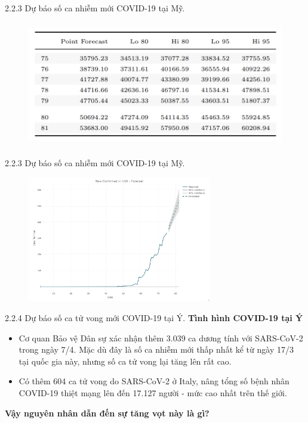 \documentclass[notheorems,envcountsect,hyperref=unicode]{beamer}
\begin{document}
\begin{frame}{2.2.3 Dự báo số ca nhiễm mới COVID-19 tại Mỹ.}
	\begin{figure}[!htb]
		\centering
		\includegraphics[width=1\linewidth,height=5.5cm]{duong3} 
	\end{figure}
\end{frame}

\begin{frame}{2.2.3 Dự báo số ca nhiễm mới COVID-19 tại Mỹ.}
	\begin{figure}[!htb]
		\centering
		\includegraphics[width=1\linewidth,height=5.5cm]{A7} 
	\end{figure}
\end{frame}

\begin{frame}{2.2.4 Dự báo số ca tử vong mới COVID-19 tại Ý.}
\textbf{Tình hình COVID-19 tại Ý}\\
\begin{itemize}
	\item Cơ quan Bảo vệ Dân sự xác nhận thêm 3.039 ca dương tính với SARS-CoV-2 trong ngày 7/4. Mặc dù đây là số ca nhiễm mới thấp nhất kể từ ngày 17/3 tại quốc gia này, nhưng số ca tử vong lại tăng lên rất cao.
	\item Có thêm 604 ca tử vong do SARS-CoV-2 ở Italy, nâng tổng số bệnh nhân COVID-19 thiệt mạng lên đến 17.127 người - mức cao nhất trên thế giới.
\end{itemize}
\pause
\textbf{Vậy nguyên nhân dẫn đến sự tăng vọt này là gì?}
\end{frame}
\end{document}
